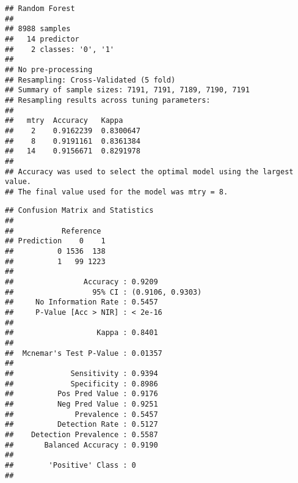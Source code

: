 \documentclass[
]{article}
\newenvironment{Shaded}{\begin{snugshade}}{\end{snugshade}}
\newcommand{\CommentTok}[1]{\textcolor[rgb]{0.56,0.35,0.01}{\textit{#1}}}
\newcommand{\FunctionTok}[1]{\textcolor[rgb]{0.13,0.29,0.53}{\textbf{#1}}}
\newcommand{\NormalTok}[1]{#1}
\newcommand{\OtherTok}[1]{\textcolor[rgb]{0.56,0.35,0.01}{#1}}
\newcommand{\SpecialCharTok}[1]{\textcolor[rgb]{0.81,0.36,0.00}{\textbf{#1}}}
\begin{document}
\begin{verbatim}
## Random Forest 
## 
## 8988 samples
##   14 predictor
##    2 classes: '0', '1' 
## 
## No pre-processing
## Resampling: Cross-Validated (5 fold) 
## Summary of sample sizes: 7191, 7191, 7189, 7190, 7191 
## Resampling results across tuning parameters:
## 
##   mtry  Accuracy   Kappa    
##    2    0.9162239  0.8300647
##    8    0.9191161  0.8361384
##   14    0.9156671  0.8291978
## 
## Accuracy was used to select the optimal model using the largest value.
## The final value used for the model was mtry = 8.
\end{verbatim}

\begin{Shaded}
\end{Shaded}

\begin{verbatim}
## Confusion Matrix and Statistics
## 
##           Reference
## Prediction    0    1
##          0 1536  138
##          1   99 1223
##                                           
##                Accuracy : 0.9209          
##                  95% CI : (0.9106, 0.9303)
##     No Information Rate : 0.5457          
##     P-Value [Acc > NIR] : < 2e-16         
##                                           
##                   Kappa : 0.8401          
##                                           
##  Mcnemar's Test P-Value : 0.01357         
##                                           
##             Sensitivity : 0.9394          
##             Specificity : 0.8986          
##          Pos Pred Value : 0.9176          
##          Neg Pred Value : 0.9251          
##              Prevalence : 0.5457          
##          Detection Rate : 0.5127          
##    Detection Prevalence : 0.5587          
##       Balanced Accuracy : 0.9190          
##                                           
##        'Positive' Class : 0               
## 
\end{verbatim}
\end{document}
